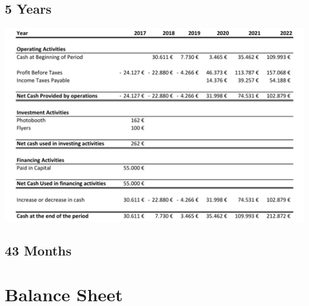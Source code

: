 \documentclass[12pt,a4paper,oneside]{book}
\begin{document}
\section{5 Years}
\begin{center}
\includegraphics[keepaspectratio=true,width=\textwidth]{../sheets/cfs5.pdf}
\end{center}
\section{43 Months}


\chapter{Balance Sheet}
\label{bs}

\end{document}
